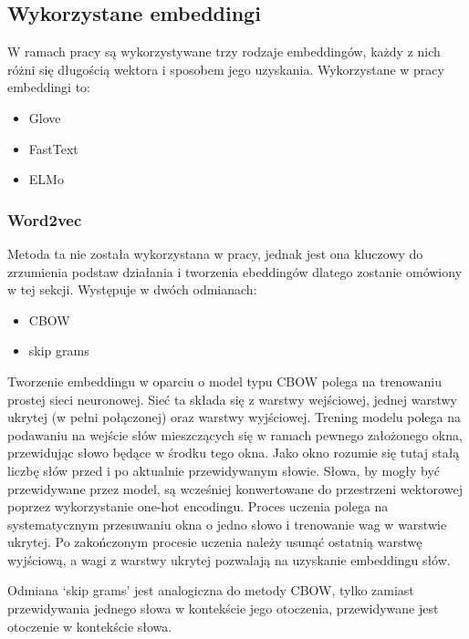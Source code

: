 \subsection{Wykorzystane embeddingi}
W ramach pracy są wykorzystywane trzy rodzaje embeddingów, każdy z nich różni się długością wektora i sposobem jego uzyskania. Wykorzystane w pracy embeddingi to:
\begin{itemize}
    \item Glove
    \item FastText
    \item ELMo
\end{itemize}



\subsubsection{Word2vec}
Metoda ta nie została wykorzystana w pracy, jednak jest ona kluczowy do zrzumienia podstaw działania i tworzenia ebeddingów dlatego zostanie omówiony w tej sekcji. Występuje w dwóch odmianach: 

\begin{itemize}
    \item CBOW
    \item skip grams 
\end{itemize}



Tworzenie embeddingu w oparciu o model typu CBOW polega na trenowaniu prostej sieci neuronowej. Sieć ta składa się z warstwy wejściowej, jednej warstwy ukrytej (w pełni połączonej) oraz warstwy wyjściowej. Trening modelu polega na podawaniu na wejście słów mieszczących się w ramach pewnego założonego okna, przewidując słowo będące w środku tego okna. Jako okno rozumie się tutaj stałą liczbę słów przed i po aktualnie przewidywanym słowie. Słowa, by mogły być przewidywane przez model, są wcześniej konwertowane do przestrzeni wektorowej poprzez wykorzystanie one-hot encodingu. Proces uczenia polega na systematycznym przesuwaniu okna o jedno słowo i trenowanie wag w warstwie ukrytej. Po zakończonym procesie uczenia należy usunąć ostatnią warstwę wyjściową, a wagi z warstwy ukrytej pozwalają na uzyskanie embeddingu słów.  

Odmiana ‘skip grams’ jest analogiczna do metody CBOW, tylko zamiast przewidywania jednego słowa w kontekście jego otoczenia, przewidywane jest otoczenie w kontekście słowa. 


